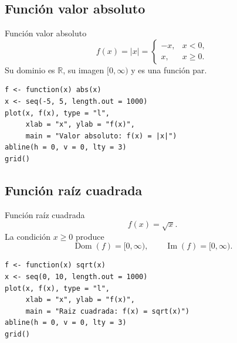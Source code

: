 \documentclass[aspectratio=169,10pt]{beamer}
\newcommand{\R}{\mathbb{R}}
\newcommand{\Dom}{\operatorname{Dom}}
\newcommand{\Ima}{\operatorname{Im}}
\begin{document}
\subsection{Función valor absoluto}
\begin{frame}{Función valor absoluto}
\[
f(x)=|x|=
\begin{cases}
-x,&x<0,\\
x,&x\geq0.
\end{cases}
\]
Su dominio es $\R$, su imagen $[0,\infty)$ y es una función par.

\begin{center}
\end{center}

\begin{verbatim}
f <- function(x) abs(x)
x <- seq(-5, 5, length.out = 1000)
plot(x, f(x), type = "l",
     xlab = "x", ylab = "f(x)",
     main = "Valor absoluto: f(x) = |x|")
abline(h = 0, v = 0, lty = 3)
grid()
\end{verbatim}

\end{frame}
\subsection{Función raíz cuadrada}
\begin{frame}{Función raíz cuadrada}
\[
f(x)=\sqrt{x}.
\]
La condición $x\geq0$ produce
\[
\Dom(f)=[0,\infty),\qquad \Ima(f)=[0,\infty).
\]

\begin{center}
\end{center}

\begin{verbatim}
f <- function(x) sqrt(x)
x <- seq(0, 10, length.out = 1000)
plot(x, f(x), type = "l",
     xlab = "x", ylab = "f(x)",
     main = "Raiz cuadrada: f(x) = sqrt(x)")
abline(h = 0, v = 0, lty = 3)
grid()
\end{verbatim}

\end{frame}
\end{document}
